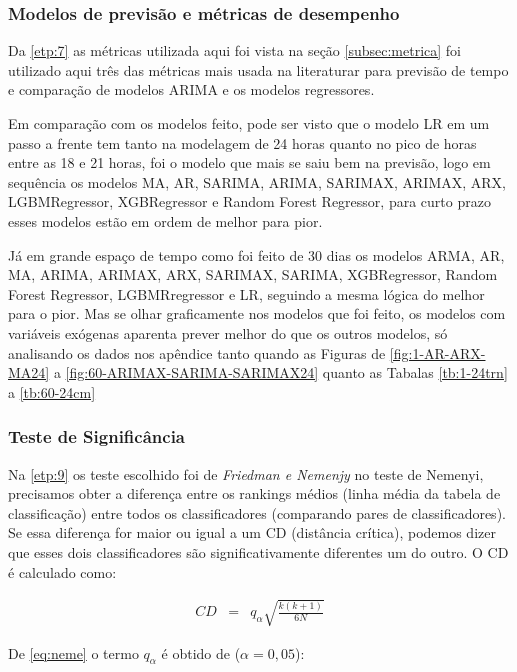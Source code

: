 \subsubsection{Modelos de previs\~ao e m\'etricas de desempenho}\label{subsubsec:modelos}

Da \ref{etp:7} as métricas utilizada aqui foi vista na seção \ref{subsec:metrica} foi utilizado aqui três das métricas mais usada na literaturar para previsão de tempo e comparação de modelos ARIMA e os modelos regressores.

    Em comparação com os modelos feito, pode ser visto que o modelo LR em um passo a frente tem tanto na modelagem de 24 horas quanto no pico de horas entre as 18 e 21 horas, foi o modelo que mais se saiu bem na previsão, logo em sequência os modelos MA, AR, SARIMA, ARIMA, SARIMAX, ARIMAX, ARX, LGBMRegressor, XGBRegressor e Random Forest Regressor, para curto prazo esses modelos estão em ordem de melhor para pior.
    
    Já em grande espaço de tempo como foi feito de 30 dias os modelos ARMA, AR, MA, ARIMA, ARIMAX, ARX, SARIMAX, SARIMA, XGBRegressor, Random Forest Regressor, LGBMRregressor e LR, seguindo a mesma lógica do melhor para o pior. Mas se olhar graficamente nos modelos que foi feito, os modelos com variáveis exógenas aparenta prever melhor do que os outros modelos, só analisando os dados nos apêndice tanto quando as Figuras de \ref{fig:1-AR-ARX-MA24} a \ref{fig:60-ARIMAX-SARIMA-SARIMAX24} quanto as Tabalas \ref{tb:1-24trn} a \ref{tb:60-24cm}   
    
    \subsubsection{Teste de Signific\^ancia}
    
    Na \ref{etp:9} os teste escolhido foi de \textit{Friedman e Nemenjy} no teste de Nemenyi, precisamos obter a diferença entre os rankings médios (linha média da tabela de classificação) entre todos os classificadores (comparando pares de classificadores). Se essa diferença for maior ou igual a um CD (distância crítica), podemos dizer que esses dois classificadores são significativamente diferentes um do outro. O CD é calculado como:
    
    \begin{eqnarray}
    	C D&=&q_\alpha \sqrt{\frac{k(k+1)}{6 N}}\label{eq:neme}
    \end{eqnarray}

De \eqref{eq:neme} o termo $q_\alpha$ é obtido de ($\alpha=0,05$):

